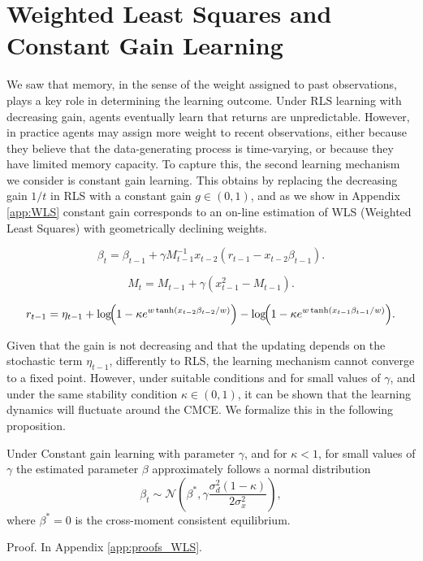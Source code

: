 \documentclass[11pt]{article}
\begin{document}
\section{Weighted Least Squares and Constant Gain Learning}\label{sec:w_ls}

We saw that memory, in the sense of the weight assigned to past observations, plays a key role in determining the learning outcome.
Under RLS learning with decreasing gain, agents eventually learn that returns are unpredictable.
However, in practice agents may assign more weight to recent observations, either because they believe that the data-generating process is time-varying, or because they have limited memory capacity.
To capture this, the second learning mechanism we consider is constant gain learning.
This obtains by replacing the decreasing gain $1/t$ in RLS with a constant gain $g \in (0,1)$, and as we show in Appendix \ref{app:WLS} constant gain corresponds to an on-line estimation of WLS (Weighted Least Squares) with geometrically declining weights.

\begin{equation}
    \beta_t = \beta_{t-1} + \gamma M^{-1}_{t-1} x_{t-2} (r_{t-1} - x_{t-2} \beta_{t-1}).
\end{equation}

\begin{equation}
    M_t = M_{t-1} + \gamma \left(x_{t-1}^2 - M_{t-1} \right).
\end{equation}

\begin{equation}\label{eq:constant_gain_returns}
    r_{t-1} = \eta_{t-1}
    + \log\!\Bigl(1 - \kappa e^{w \tanh(x_{t-2} \beta_{t-2} / w)}\Bigr)
    - \log\!\Bigl(1 - \kappa e^{w \tanh(x_{t-1} \beta_{t-1} / w)}\Bigr).
\end{equation} 



Given that the gain is not decreasing and that the updating depends on the stochastic term $\eta_{t-1}$, differently to RLS, the learning mechanism cannot converge to a fixed point.
However, under suitable conditions and for small values of $\gamma$, and under the same stability condition $\kappa \in (0, 1)$, it can be shown that the learning dynamics will fluctuate around the CMCE.
We formalize this in the following proposition.
\begin{proposition} \label{prop:WLS_distribution}
    Under Constant gain learning with parameter $\gamma$, and for $\kappa < 1$, for small values of $\gamma$ the estimated parameter $\beta$ approximately follows a normal distribution
\begin{equation}
    \beta_t \sim \mathcal{N} \left(\beta^*, \gamma \frac{\sigma_d^2 (1 - \kappa)}{2 \sigma^2_x}\right),
\end{equation}
where $\beta^* = 0$ is the cross-moment consistent equilibrium.
\end{proposition}
Proof. In Appendix \ref{app:proofs_WLS}.
\end{document}
